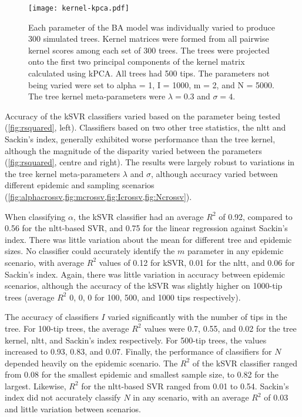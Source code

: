 \begin{figure}[ht]
  \centering
  \texttt{[image: kernel-kpca.pdf]}
  \caption[\gls{kPCA} projections of simulated trees under varying \gls{BA}
           parameter values]{
    Each parameter of the \gls{BA} model was individually varied to produce 300
    simulated trees. Kernel matrices were formed from all pairwise kernel
    scores among each set of 300 trees. The trees were projected onto the first
    two principal components of the kernel matrix calculated using \gls{kPCA}.
    All trees had 500 tips. The parameters not being varied were set to
    \gls{alpha} = 1, \gls{I} = 1000, \gls{m} = 2, and \gls{N} = 5000. The tree
    kernel meta-parameters were $\lambda = 0.3$ and $\sigma = 4$.
  }
  \label{fig:kpca}
\end{figure}



Accuracy of the \gls{kSVR} classifiers varied based on the parameter being
tested (\cref{fig:rsquared}, left). Classifiers based on two other tree
statistics, the \gls{nltt} and Sackin's index, generally exhibited worse
performance than the tree kernel, although the magnitude of the disparity
varied between the parameters (\cref{fig:rsquared}, centre and right). The
results were largely robust to variations in the tree kernel meta-parameters
$\lambda$ and $\sigma$, although accuracy varied between different epidemic and
sampling scenarios
(\cref{fig:alphacrossv,fig:mcrossv,fig:Icrossv,fig:Ncrossv}).

When classifying $\alpha$, the \gls{kSVR} classifier had an average $R^2$ of 
    0.92,
compared to 
    0.56
for the \gls{nltt}-based SVR, and
    0.75
for the linear regression against Sackin's index. There was little variation
about the mean for different tree and epidemic sizes. No classifier could
accurately identify the $m$ parameter in any epidemic scenario, with average
$R^2$ values of 
  0.12 for \gls{kSVR},
  0.01 for the \gls{nltt}, and
  0.06
for Sackin's index. Again, there was little variation in accuracy between
epidemic scenarios, although the accuracy of the \gls{kSVR} was slightly higher
on 1000-tip trees 
    (average $R^2$ 
     0,
     0,
     0
     for 100, 500, and 1000 tips respectively).

The accuracy of classifiers $I$ varied significantly with the number of tips in
the tree. For 100-tip trees, the average $R^2$ values were
  0.7,
  0.55, and
  0.02
for the tree kernel, \gls{nltt}, and Sackin's index respectively. For 500-tip
trees, the values increased to
  0.93,
  0.83, and
  0.07.
Finally, the performance of classifiers for $N$ depended heavily on the
epidemic scenario. The $R^2$ of the \gls{kSVR} classifier ranged from
  0.08
for the smallest epidemic and smallest sample size, to
  0.82
for the largest. Likewise, $R^2$ for the \gls{nltt}-based SVR ranged from 
  0.01
to
  0.54.
Sackin's index did not accurately classify $N$ in any scenario, with an average
$R^2$ of
  0.03
and little variation between scenarios.

